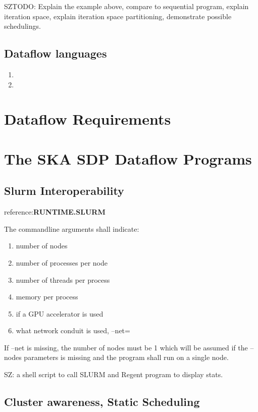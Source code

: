 \documentclass[11pt,a4paper]{article}
\begin{document}
SZTODO: Explain the example above, compare to sequential program, explain iteration space, explain iteration space partitioning, demonstrate possible schedulings.

\subsection{Dataflow languages}


\begin{enumerate}
  \item


 \item 
\end{enumerate}


\section{Dataflow Requirements}
\label{sec:dataflow-requirements}


\section{The SKA SDP Dataflow Programs}
\label{sec:dataflow-examples}

\subsection{Slurm Interoperability}
reference:{\bf RUNTIME.SLURM}

The commandline arguments shall indicate:
\begin{enumerate}
    \item number of nodes
    \item number of processes per node
    \item number of threads per process
    \item memory per process
    \item if a GPU accelerator is used
    \item what network conduit is used, --net=
\end{enumerate}

If --net is missing, the number of nodes must be 1 which will be assumed if the --nodes parameters is missing and the program shall run on a single node.

SZ: a shell script to call SLURM and Regent program to display stats.

\subsection{Cluster awareness, Static Scheduling}
\end{document}
